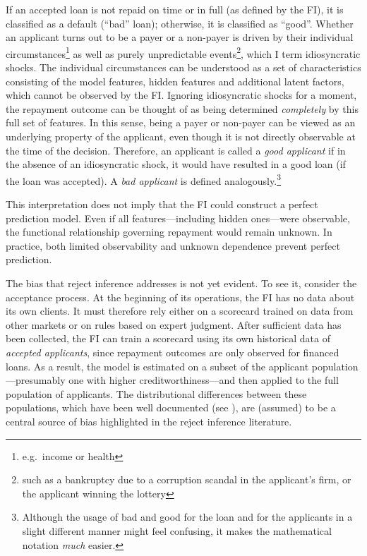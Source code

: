\documentclass[
  12pt,
]{article}
\begin{document}
If an accepted loan is not repaid on time or in full (as defined by the
FI), it is classified as a default (``bad'' loan); otherwise, it is
classified as ``good''. Whether an applicant turns out to be a payer or
a non-payer is driven by their individual circumstances\footnote{e.g.~income
  or health} as well as purely unpredictable events\footnote{such as a
  bankruptcy due to a corruption scandal in the applicant's firm, or the
  applicant winning the lottery}, which I term idiosyncratic shocks. The
individual circumstances can be understood as a set of characteristics
consisting of the model features, hidden features and additional latent
factors, which cannot be observed by the FI. Ignoring idiosyncratic
shocks for a moment, the repayment outcome can be thought of as being
determined \emph{completely} by this full set of features. In this
sense, being a payer or non-payer can be viewed as an underlying
property of the applicant, even though it is not directly observable at
the time of the decision. Therefore, an applicant is called a \emph{good
applicant} if in the absence of an idiosyncratic shock, it would have
resulted in a good loan (if the loan was accepted). A \emph{bad
applicant} is defined analogously.\footnote{ Although the usage of bad
  and good for the loan and for the applicants in a slight different
  manner might feel confusing, it makes the mathematical notation
  \emph{much} easier.}

This interpretation does not imply that the FI could construct a perfect
prediction model. Even if all features---including hidden ones---were
observable, the functional relationship governing repayment would remain
unknown. In practice, both limited observability and unknown dependence
prevent perfect prediction.

The bias that reject inference addresses is not yet evident. To see it,
consider the acceptance process. At the beginning of its operations, the
FI has no data about its own clients. It must therefore rely either on a
scorecard trained on data from other markets or on rules based on expert
judgment. After sufficient data has been collected, the FI can train a
scorecard using its own historical data of \emph{accepted applicants},
since repayment outcomes are only observed for financed loans. As a
result, the model is estimated on a subset of the applicant
population---presumably one with higher creditworthiness---and then
applied to the full population of applicants. The distributional
differences between these populations, which have been well documented
(see \textcite{kozdoi_et_al_BE_BASL}), are (assumed) to be a central
source of bias highlighted in the reject inference literature.
\end{document}
